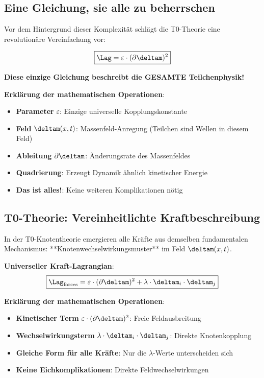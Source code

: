 	\subsection{Eine Gleichung, sie alle zu beherrschen}
	
	Vor dem Hintergrund dieser Komplexität schlägt die T0-Theorie eine revolutionäre Vereinfachung vor:
	
	\begin{equation}
		\boxed{\Lag = \varepsilon \cdot (\partial \deltam)^2}
		\label{eq:revolutionary_lagrangian}
	\end{equation}
	
	\textbf{Diese einzige Gleichung beschreibt die GESAMTE Teilchenphysik!}
	
	\textbf{Erklärung der mathematischen Operationen}:
	\begin{itemize}
		\item \textbf{Parameter} $\varepsilon$: Einzige universelle Kopplungskonstante
		\item \textbf{Feld} $\deltam(x,t)$: Massenfeld-Anregung (Teilchen sind Wellen in diesem Feld)
		\item \textbf{Ableitung} $\partial \deltam$: Änderungsrate des Massenfeldes
		\item \textbf{Quadrierung}: Erzeugt Dynamik ähnlich kinetischer Energie
		\item \textbf{Das ist alles!}: Keine weiteren Komplikationen nötig
	\end{itemize}
	
	\subsection{T0-Theorie: Vereinheitlichte Kraftbeschreibung}
	
	In der T0-Knotentheorie emergieren alle Kräfte aus demselben fundamentalen Mechanismus: **Knotenwechselwirkungsmuster** im Feld $\deltam(x,t)$.
	
	\textbf{Universeller Kraft-Lagrangian}:
	\begin{equation}
		\boxed{\Lag_{\text{forces}} = \varepsilon \cdot (\partial \deltam)^2 + \lambda \cdot \deltam_i \cdot \deltam_j}
	\end{equation}
	
	\textbf{Erklärung der mathematischen Operationen}:
	\begin{itemize}
		\item \textbf{Kinetischer Term} $\varepsilon \cdot (\partial \deltam)^2$: Freie Feldausbreitung
		\item \textbf{Wechselwirkungsterm} $\lambda \cdot \deltam_i \cdot \deltam_j$: Direkte Knotenkopplung
		\item \textbf{Gleiche Form für alle Kräfte}: Nur die $\lambda$-Werte unterscheiden sich
		\item \textbf{Keine Eichkomplikationen}: Direkte Feldwechselwirkungen
	\end{itemize}
	
